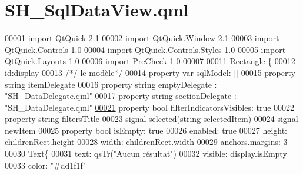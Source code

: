 \hypertarget{SH__SqlDataView_8qml}{\section{S\-H\-\_\-\-Sql\-Data\-View.\-qml}
\label{SH__SqlDataView_8qml}
}

\begin{DoxyCode}
00001 \textcolor{keyword}{import} QtQuick 2.1
00002 import QtQuick.Window 2.1
00003 import QtQuick.Controls 1.0
\hypertarget{SH__SqlDataView_8qml_source_l00004}{}\hyperlink{classSH__SqlDataView}{00004} import QtQuick.Controls.Styles 1.0
00005 import QtQuick.Layouts 1.0
00006 import PreCheck 1.0
\hypertarget{SH__SqlDataView_8qml_source_l00007}{}\hyperlink{classSH__SqlDataView_ad538d6f1dd43a7d01c7960a74ca131dc}{00007} 
\hypertarget{SH__SqlDataView_8qml_source_l00011}{}\hyperlink{classSH__SqlDataView_af2c0c75bb57606451699027fa74eeda2}{00011} Rectangle \{
00012     \textcolor{keywordtype}{id}:display
\hypertarget{SH__SqlDataView_8qml_source_l00013}{}\hyperlink{classSH__SqlDataView_a60486947b034f5fca72a2d5775ad1767}{00013}     \textcolor{comment}{/*/ le modèle*/}
00014     \textcolor{keyword}{property} var sqlModel: []
00015     \textcolor{keyword}{property} \textcolor{keywordtype}{string} itemDelegate
00016     \textcolor{keyword}{property} \textcolor{keywordtype}{string} emptyDelegate : \textcolor{stringliteral}{"SH\_DataDelegate.qml"}
\hypertarget{SH__SqlDataView_8qml_source_l00017}{}\hyperlink{classSH__SqlDataView_afdc0805dc2ce3af4e9ce5331a81d7e13}{00017}     \textcolor{keyword}{property} \textcolor{keywordtype}{string} sectionDelegate : \textcolor{stringliteral}{"SH\_DataDelegate.qml"}
\hypertarget{SH__SqlDataView_8qml_source_l00021}{}\hyperlink{classSH__SqlDataView_a3ceaf016d4dace986a92e2e77772bac9}{00021}     \textcolor{keyword}{property} \textcolor{keywordtype}{bool} filterIndicatorsVisibles: \textcolor{keyword}{true}
00022     \textcolor{keyword}{property} \textcolor{keywordtype}{string} filtersTitle
00023     signal selected(\textcolor{keywordtype}{string} selectedItem)
00024     signal newItem
00025     \textcolor{keyword}{property} \textcolor{keywordtype}{bool} isEmpty: \textcolor{keyword}{true}
00026     enabled: \textcolor{keyword}{true}
00027     height: childrenRect.height
00028     width: childrenRect.width
00029     anchors.margins: 3
00030     Text\{
00031         text: qsTr(\textcolor{stringliteral}{"Aucun résultat"})
00032         visible: display.isEmpty
00033         color: \textcolor{stringliteral}{"#dd1f1f"}

\end{DoxyCode}
